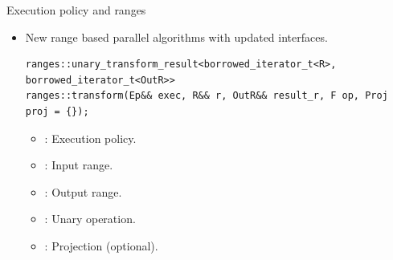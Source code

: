 \begin{frame}[t,fragile]{Execution policy and ranges}
\begin{itemize}
    \item New range based parallel algorithms with updated interfaces.

\begin{lstlisting}
ranges::unary_transform_result<borrowed_iterator_t<R>, borrowed_iterator_t<OutR>>
ranges::transform(Ep&& exec, R&& r, OutR&& result_r, F op, Proj proj = {});
\end{lstlisting}

  \begin{itemize}
    \item {}: Execution policy.
    \item {}: Input range.
    \item {}: Output range.
    \item {}: Unary operation.
    \item {}: Projection (optional).
  \end{itemize}
\end{itemize}
\end{frame}

